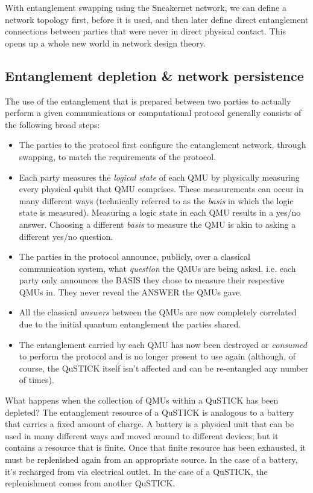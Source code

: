\documentclass[twocolumn, aps, rmp, amsmath, amssymb, nofootinbib, superscriptaddress, longbibliography, floatfix, table-of-contents, eqsecnum]{revtex4-2}
\begin{document}
With entanglement swapping using the Sneakernet network, we can define a network topology first, before it is used, and then later define direct entanglement connections between parties that were never in direct physical contact. This opens up a whole new world in network design theory. 

\subsection{Entanglement depletion \& network persistence}

The use of the entanglement that is prepared between two parties to actually perform a given communications or computational protocol generally consists of the following broad steps: 
\begin{itemize}
\item The parties to the protocol first configure the entanglement network, through swapping, to match the requirements of the protocol.
\item Each party measures the \textit{logical state} of each QMU by physically measuring every physical qubit that QMU comprises. These measurements can occur in many different ways (technically referred to as the \textit{basis} in which the logic state is measured). Measuring a logic state in each QMU results in a yes/no answer. Choosing a different \textit{basis} to measure the QMU is akin to asking a different yes/no question. 
\item The parties in the protocol announce, publicly, over a classical communication system, what \textit{question} the QMUs are being asked. i.e. each party only announces the BASIS they chose to measure their respective QMUs in. They never reveal the ANSWER the QMUs gave. 
\item All the classical \textit{answers} between the QMUs are now completely correlated due to the initial quantum entanglement the parties shared. 
\item The entanglement carried by each QMU has now been destroyed or \textit{consumed} to perform the protocol and is no longer present to use again (although, of course, the QuSTICK itself isn't affected and can be re-entangled any number of times). 
\end{itemize}

What happens when the collection of QMUs within a QuSTICK has been depleted? The entanglement resource of a QuSTICK is analogous to a battery that carries a fixed amount of charge. A battery is a physical unit that can be used in many different ways and moved around to different devices; but it contains a resource that is finite. Once that finite resource has been exhausted, it must be replenished again from an appropriate source. In the case of a battery, it's recharged from via electrical outlet. In the case of a QuSTICK, the replenishment comes from another QuSTICK.
\end{document}
